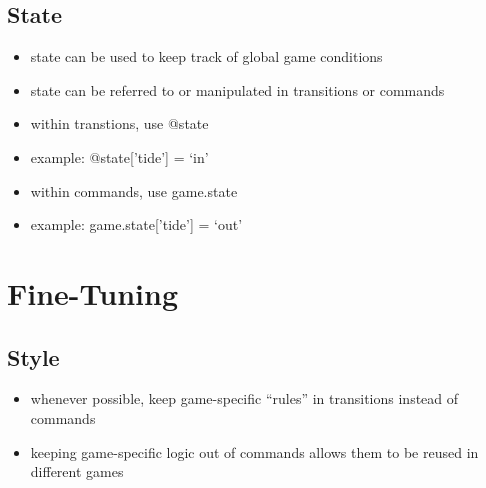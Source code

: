 \documentclass[letterpaper,10pt,english]{manual}
\begin{document}
\section{State}
\begin{itemize}
\item {} 
state can be used to keep track of global game conditions

\item {} 
state can be referred to or manipulated in transitions or commands

\item {} 
within transtions, use @state

\item {} 
example: @state{[}'tide'{]} = `in'

\item {} 
within commands, use game.state

\item {} 
example: game.state{[}'tide'{]} = `out'

\end{itemize}

\resetcurrentobjects
\hypertarget{--doc-fine_tuning}{}

\chapter{Fine-Tuning}


\section{Style}
\begin{itemize}
\item {} 
whenever possible, keep game-specific ``rules'' in transitions instead of commands

\item {} 
keeping game-specific logic out of commands allows them to be reused in different games

\end{itemize}
\end{document}
